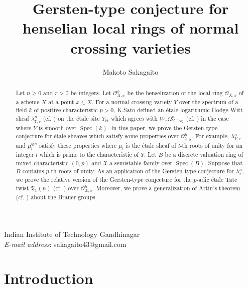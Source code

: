 \documentclass{article}
\newcommand{\spec}{\operatorname{Spec}}
\newcommand{\et}{\mathrm{\acute{e}t}}
\begin{document}
\author{Makoto Sakagaito}
\title{
Gersten-type conjecture for henselian local rings of normal crossing varieties}
\date{}
%
\maketitle
%
%
\begin{center}
Indian Institute of Technology Gandhinagar
\\
\textit{E-mail address}: sakagaito43@gmail.com
\end{center}
%

%
\begin{abstract}
Let $n\geq 0$ and $r>0$ be integers. 
Let $\mathcal{O}_{X, x}^{h}$ be the henselization of the local ring $\mathcal{O}_{X, x}$
of a scheme $X$ at a point $x\in X$.
For a normal crossing variety $Y$ over the spectrum of a field $k$ of positive characteristic $p>0$,
K.Sato defined an \'{e}tale logarithmic Hodge-Witt sheaf $\lambda^{n}_{Y, r}$ (cf. \cite[p.726, Definition 3.1.1 (1)]{SaL})
on the \'{e}tale site $Y_{\et}$
which agrees with $W_{r}\Omega^{n}_{Y, \log}$ (cf. \cite{I}) in the case where $Y$ is smooth over
$\spec(k)$. 
In this paper, we prove the Gersten-type conjecture for 
\'{e}tale sheaves which satisfy some properties 
over $\mathcal{O}_{Y, y}^{h}$. 
For example, $\lambda_{Y, r}^{n}$ and $\mu_{l}^{\otimes n}$
satisfy these properties 
where $\mu_{l}$ is the \'{e}tale sheaf of $l$-th roots of unity
for an integer $l$ which is prime to the characteristic of $Y$.
Let $B$ be a discrete valuation ring of mixed characteristic $(0, p)$
and $\mathfrak{X}$ a semistable family over $\spec(B)$.
Suppose that $B$ contains $p$-th roots of unity.
As an application of the Gersten-type conjecture for $\lambda^{n}_{r}$, 
we prove the relative version of the Gersten-type conjecture
for the $p$-adic \'{e}tale Tate twist $\mathfrak{T}_{1}(n)$ (cf. \cite[pp.537--538, Definition 4.2.4]{SaP}) over 
$\mathcal{O}_{\mathfrak{X}, x}^{h}$. 
Moreover, we prove a generalization of Artin's theorem 
(cf. \cite[p.98, Th\'{e}or\`{e}me (3.1)]{Gr}) about the Brauer groups.
\end{abstract}
%

\section{Introduction}
\end{document}
